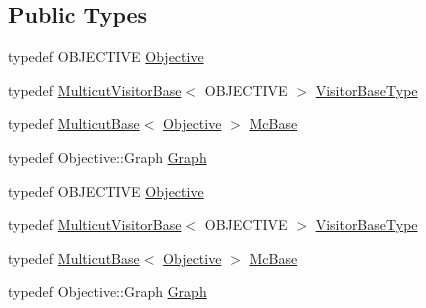 \subsection*{Public Types}
\begin{DoxyCompactItemize}
\item 
typedef O\+B\+J\+E\+C\+T\+I\+V\+E \hyperlink{classnifty_1_1graph_1_1optimization_1_1multicut_1_1PyMulticutVisitorBase_abb6bb7370d72d0a22f2235789634e592}{Objective}
\item 
typedef \hyperlink{namespacenifty_1_1graph_1_1optimization_1_1multicut_ac347ba5e0f64a15fd2ad835dfc727b2b}{Multicut\+Visitor\+Base}$<$ O\+B\+J\+E\+C\+T\+I\+V\+E $>$ \hyperlink{classnifty_1_1graph_1_1optimization_1_1multicut_1_1PyMulticutVisitorBase_ae436994b1c4379009dac9fd8e8935709}{Visitor\+Base\+Type}
\item 
typedef \hyperlink{classnifty_1_1graph_1_1optimization_1_1multicut_1_1MulticutBase}{Multicut\+Base}$<$ \hyperlink{classnifty_1_1graph_1_1optimization_1_1multicut_1_1PyMulticutVisitorBase_abb6bb7370d72d0a22f2235789634e592}{Objective} $>$ \hyperlink{classnifty_1_1graph_1_1optimization_1_1multicut_1_1PyMulticutVisitorBase_a8f1b90c5df32b68d5f5cad637dca2362}{Mc\+Base}
\item 
typedef Objective\+::\+Graph \hyperlink{classnifty_1_1graph_1_1optimization_1_1multicut_1_1PyMulticutVisitorBase_a16364c92a16384fb4267dc1065181c17}{Graph}
\item 
typedef O\+B\+J\+E\+C\+T\+I\+V\+E \hyperlink{classnifty_1_1graph_1_1optimization_1_1multicut_1_1PyMulticutVisitorBase_abb6bb7370d72d0a22f2235789634e592}{Objective}
\item 
typedef \hyperlink{namespacenifty_1_1graph_1_1optimization_1_1multicut_ac347ba5e0f64a15fd2ad835dfc727b2b}{Multicut\+Visitor\+Base}$<$ O\+B\+J\+E\+C\+T\+I\+V\+E $>$ \hyperlink{classnifty_1_1graph_1_1optimization_1_1multicut_1_1PyMulticutVisitorBase_ae436994b1c4379009dac9fd8e8935709}{Visitor\+Base\+Type}
\item 
typedef \hyperlink{classnifty_1_1graph_1_1optimization_1_1multicut_1_1MulticutBase}{Multicut\+Base}$<$ \hyperlink{classnifty_1_1graph_1_1optimization_1_1multicut_1_1PyMulticutVisitorBase_abb6bb7370d72d0a22f2235789634e592}{Objective} $>$ \hyperlink{classnifty_1_1graph_1_1optimization_1_1multicut_1_1PyMulticutVisitorBase_a8f1b90c5df32b68d5f5cad637dca2362}{Mc\+Base}
\item 
typedef Objective\+::\+Graph \hyperlink{classnifty_1_1graph_1_1optimization_1_1multicut_1_1PyMulticutVisitorBase_a16364c92a16384fb4267dc1065181c17}{Graph}
\end{DoxyCompactItemize}
